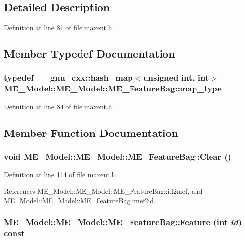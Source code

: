 \subsection{Detailed Description}


Definition at line 81 of file maxent.h.

\subsection{Member Typedef Documentation}
\hypertarget{structME__Model_1_1ME__FeatureBag_d4e42dca8ac5b9a369e9c3882ae8741b}{
\subsubsection[{map\_\-type}]{\setlength{\rightskip}{0pt plus 5cm}typedef \_\-\_\-gnu\_\-cxx::hash\_\-map$<$unsigned int, int$>$ ME\_\-Model::ME\_\-Model::ME\_\-FeatureBag::map\_\-type}}
\label{structME__Model_1_1ME__FeatureBag_d4e42dca8ac5b9a369e9c3882ae8741b}




Definition at line 84 of file maxent.h.

\subsection{Member Function Documentation}
\hypertarget{structME__Model_1_1ME__FeatureBag_4ec198541dd60323cc15e72a246a0705}{
\subsubsection[{Clear}]{\setlength{\rightskip}{0pt plus 5cm}void ME\_\-Model::ME\_\-Model::ME\_\-FeatureBag::Clear ()}}
\label{structME__Model_1_1ME__FeatureBag_4ec198541dd60323cc15e72a246a0705}




Definition at line 114 of file maxent.h.

References ME\_\-Model::ME\_\-Model::ME\_\-FeatureBag::id2mef, and ME\_\-Model::ME\_\-Model::ME\_\-FeatureBag::mef2id.\hypertarget{structME__Model_1_1ME__FeatureBag_8f70045a4517cc8075832474eb4e01f1}{
\subsubsection[{Feature}]{ ME\_\-Model::ME\_\-Model::ME\_\-FeatureBag::Feature (int {\em id}) const}}
\label{structME__Model_1_1ME__FeatureBag_8f70045a4517cc8075832474eb4e01f1}




